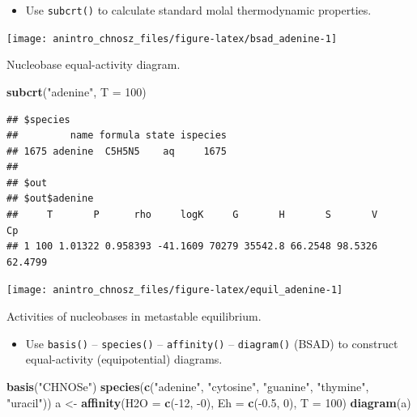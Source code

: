 \documentclass[]{tufte-handout}
\newenvironment{Shaded}{}{}
\newcommand{\KeywordTok}[1]{\textcolor[rgb]{0.00,0.44,0.13}{\textbf{#1}}}
\newcommand{\DataTypeTok}[1]{\textcolor[rgb]{0.56,0.13,0.00}{#1}}
\newcommand{\DecValTok}[1]{\textcolor[rgb]{0.25,0.63,0.44}{#1}}
\newcommand{\FloatTok}[1]{\textcolor[rgb]{0.25,0.63,0.44}{#1}}
\newcommand{\StringTok}[1]{\textcolor[rgb]{0.25,0.44,0.63}{#1}}
\newcommand{\OperatorTok}[1]{\textcolor[rgb]{0.40,0.40,0.40}{#1}}
\newcommand{\NormalTok}[1]{#1}
\providecommand{\tightlist}{%
  \setlength{\itemsep}{0pt}\setlength{\parskip}{0pt}}
\begin{document}
\begin{itemize}
\tightlist
\item
  Use {\texttt{subcrt()}} to calculate standard molal thermodynamic
  properties.
\end{itemize}

\begin{marginfigure}
\texttt{[image: anintro\_chnosz\_files/figure-latex/bsad\_adenine-1]} \caption[Nucleobase equal-activity diagram]{Nucleobase equal-activity diagram.}\label{fig:bsad_adenine}
\end{marginfigure}

\begin{Shaded}
\begin{Highlighting}[]
\KeywordTok{subcrt}\NormalTok{(}\StringTok{"adenine"}\NormalTok{, }\DataTypeTok{T =} \DecValTok{100}\NormalTok{)}
\end{Highlighting}
\end{Shaded}

\begin{verbatim}
## $species
##         name formula state ispecies
## 1675 adenine  C5H5N5    aq     1675
## 
## $out
## $out$adenine
##     T       P      rho     logK     G       H       S       V      Cp
## 1 100 1.01322 0.958393 -41.1609 70279 35542.8 66.2548 98.5326 62.4799
\end{verbatim}

\begin{marginfigure}
\texttt{[image: anintro\_chnosz\_files/figure-latex/equil\_adenine-1]} \caption[Activities of nucleobases in metastable equilibrium]{Activities of nucleobases in metastable equilibrium.}\label{fig:equil_adenine}
\end{marginfigure}

\begin{itemize}
\tightlist
\item
  Use {\texttt{basis()}} -- {\texttt{species()}} --
  {\texttt{affinity()}} -- {\texttt{diagram()}} (BSAD) to construct
  equal-activity (equipotential) diagrams.
\end{itemize}

\begin{Shaded}
\begin{Highlighting}[]
\KeywordTok{basis}\NormalTok{(}\StringTok{"CHNOSe"}\NormalTok{)}
\KeywordTok{species}\NormalTok{(}\KeywordTok{c}\NormalTok{(}\StringTok{"adenine"}\NormalTok{, }\StringTok{"cytosine"}\NormalTok{, }\StringTok{"guanine"}\NormalTok{, }\StringTok{"thymine"}\NormalTok{, }\StringTok{"uracil"}\NormalTok{))}
\NormalTok{a <-}\StringTok{ }\KeywordTok{affinity}\NormalTok{(}\DataTypeTok{H2O =} \KeywordTok{c}\NormalTok{(}\OperatorTok{-}\DecValTok{12}\NormalTok{, }\OperatorTok{-}\DecValTok{0}\NormalTok{), }\DataTypeTok{Eh =} \KeywordTok{c}\NormalTok{(}\OperatorTok{-}\FloatTok{0.5}\NormalTok{, }\DecValTok{0}\NormalTok{), }\DataTypeTok{T =} \DecValTok{100}\NormalTok{)}
\KeywordTok{diagram}\NormalTok{(a)}
\end{Highlighting}
\end{Shaded}
\end{document}
